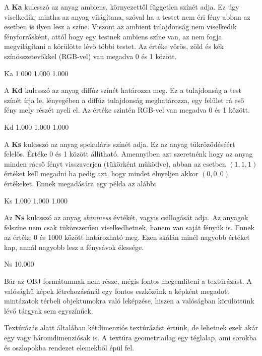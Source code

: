 A \textbf{Ka} kulcsszó az anyag ambiens, környezettől független színét adja. Ez úgy viselkedik, mintha az anyag világítana, szóval ha a testet nem éri fény abban az esetben is ilyen lesz a színe. Viszont  az ambient tulajdonság nem viselkedik fényforrásként, attól hogy egy testnek ambiens színe van, az nem fogja megvilágítani a körülötte lévő többi testet. Az értéke vörös, zöld és kék színösszetevőkkel (RGB-vel) van megadva 0 és 1 között.
\begin{python}
Ka 1.000 1.000 1.000
\end{python}

A \textbf{Kd} kulcsszó az anyag diffúz színét határozza meg. Ez a tulajdonság a test színét írja le, lényegében a diffúz tulajdonság meghatározza, egy felület rá eső fény mely részét nyeli el. Az értéke szintén RGB-vel van megadva 0 és 1 között.
\begin{python}
Kd 1.000 1.000 1.000
\end{python}

A \textbf{Ks} kulcsszó az anyag spekuláris színét adja. Ez az anyag tükröződéséért felelős. Értéke 0 és 1 között állítható. Amennyiben azt szeretnénk hogy az anyag minden ráeső fényt visszaverjen (tükörként működve), abban az esetben $(1, 1, 1)$ értéket kell megadni ha pedig azt, hogy mindet elnyeljen akkor $(0, 0, 0)$ értékeket. Ennek megadására egy példa az alábbi
\begin{python}
Ks 1.000 1.000 1.000
\end{python}

Az \textbf{Ns} kulcsszó az anyag \textit{shininess} évtékét, vagyis csillogását adja. Az anyagok felszíne nem csak tükörszerűen viselkedhetnek, hanem van saját fényük is. Ennek az értéke 0 és 1000 között határozható meg. Ezen skálán minél nagyobb értéket kap, annál nagyobb lesz a fénysávok élessége.
\begin{python}
Ns 10.000
\end{python}


Bár az OBJ formátumnak nem része, mégis fontos megemlíteni a textúrázást. A valósághű képek létrehozásánál egy fontos eszközünk a képként megadott mintázatok térbeli objektumokra való leképzése, hiszen a valóságban körülöttünk lévő tárgyak sem egyszínűek.

Textúrázás alatt általában kétdimenziós textúrázást értünk, de lehetnek ezek akár egy vagy háromdimenziósak is. A textúra geometriailag egy téglalap, ami sorokba és oszlopokba rendezet elemekből épül fel.

